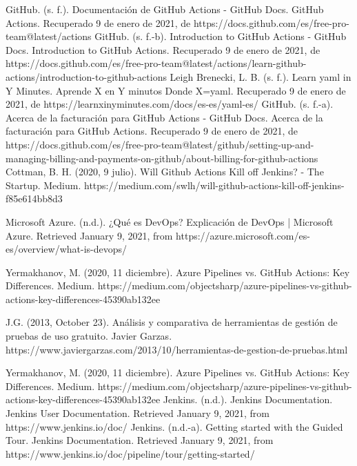 \documentclass[twoside,twocolumn]{article}
\begin{document}
\begin{thebibliography}{99} 

\bibitem[1]{}
\newblock GitHub. (s. f.). Documentación de GitHub Actions - GitHub Docs. GitHub Actions. Recuperado 9 de enero de 2021, de https://docs.github.com/es/free-pro-team@latest/actions
\bibitem[2]{}
\newblock GitHub. (s. f.-b). Introduction to GitHub Actions - GitHub Docs. Introduction to GitHub Actions. Recuperado 9 de enero de 2021, de https://docs.github.com/es/free-pro-team@latest/actions/learn-github-actions/introduction-to-github-actions
\bibitem[3]{}
\newblock Leigh Brenecki, L. B. (s. f.). Learn yaml in Y Minutes. Aprende X en Y minutos Donde X=yaml. Recuperado 9 de enero de 2021, de https://learnxinyminutes.com/docs/es-es/yaml-es/
\bibitem[4]{}
\newblock GitHub. (s. f.-a). Acerca de la facturación para GitHub Actions - GitHub Docs. Acerca de la facturación para GitHub Actions. Recuperado 9 de enero de 2021, de https://docs.github.com/es/free-pro-team@latest/github/setting-up-and-managing-billing-and-payments-on-github/about-billing-for-github-actions
\bibitem[5]{}
\newblock Cottman, B. H. (2020, 9 julio). Will Github Actions Kill off Jenkins? - The Startup. Medium. https://medium.com/swlh/will-github-actions-kill-off-jenkins-f85e614bb8d3

\bibitem[6]{}
\newblock Microsoft Azure. (n.d.). ¿Qué es DevOps? Explicación de DevOps | Microsoft Azure. Retrieved January 9, 2021, from https://azure.microsoft.com/es-es/overview/what-is-devops/

\bibitem[7]{}
\newblock Yermakhanov, M. (2020, 11 diciembre). Azure Pipelines vs. GitHub Actions: Key Differences. Medium. https://medium.com/objectsharp/azure-pipelines-vs-github-actions-key-differences-45390ab132ee

\bibitem[8]{}
\newblock J.G. (2013, October 23). Análisis y comparativa de herramientas de gestión de pruebas de uso gratuito. Javier Garzas. https://www.javiergarzas.com/2013/10/herramientas-de-gestion-de-pruebas.html

\bibitem[9]{}
\newblock Yermakhanov, M. (2020, 11 diciembre). Azure Pipelines vs. GitHub Actions: Key Differences. Medium. https://medium.com/objectsharp/azure-pipelines-vs-github-actions-key-differences-45390ab132ee
\bibitem[10]{}
\newblock Jenkins. (n.d.). Jenkins Documentation. Jenkins User Documentation. Retrieved January 9, 2021, from https://www.jenkins.io/doc/
\bibitem[11]{}
\newblock Jenkins. (n.d.-a). Getting started with the Guided Tour. Jenkins Documentation. Retrieved January 9, 2021, from https://www.jenkins.io/doc/pipeline/tour/getting-started/

\end{thebibliography}


\end{document}
